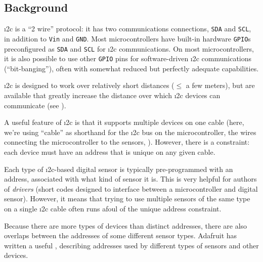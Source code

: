 \subsection{Background}
\i2c is a ``2 wire'' protocol: it has two communications connections, \texttt{SDA} and \texttt{SCL}, in addition to \texttt{Vin} and \texttt{GND}.
Most microcontrollers have built-in hardware  \texttt{GPIO}s preconfigured as \texttt{SDA} and \texttt{SCL} for \i2c communications.
On most microcontrollers, it is also possible to use other \texttt{GPIO} pins for software-driven \i2c communications (``bit-banging''), often with somewhat reduced but perfectly adequate capabilities.

\i2c is designed to work over relatively short distances ($\le$ a few meters), but  are available that greatly increase the distance over which \i2c devices can communicate (see ).

A useful feature of \i2c is that it supports multiple devices on one cable (here, we're using ``cable'' as shorthand for the \i2c bus on the microcontroller, the wires connecting the microcontroller to the sensors, \etc).
However, there is a constraint: each device must have an address that is unique on any given cable.

Each type of \i2c-based digital sensor is typically pre-programmed with an address, associated with what kind of sensor it is.
This is very helpful for authors of \emph{drivers} (short codes designed to interface between a microcontroller and digital sensor).
However, it means that trying to use multiple sensors of the same type on a single \i2c cable often runs afoul of the unique address constraint.

Because there are more types of devices than distinct addresses, there are also overlaps between the addresses of some different sensor types.
Adafruit has written a useful , describing addresses used by different types of sensors and other devices.



